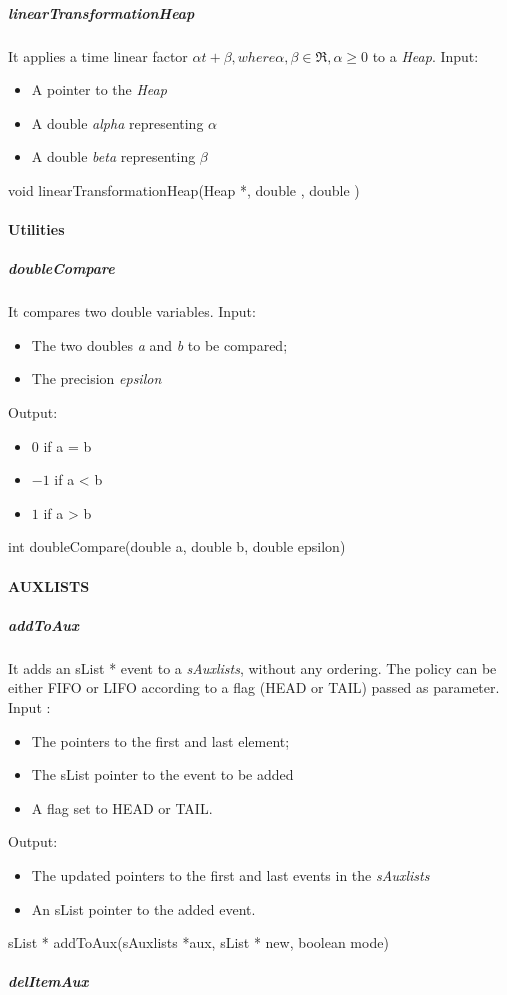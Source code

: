 \subparagraph{linearTransformationHeap}

It applies a time linear factor \(\alpha t + \beta , where \alpha, \beta \in \Re, \alpha \geq 0\) to a \textit{Heap}. 
Input:
\begin{itemize}
\item A pointer to the \textit{Heap} 
\item A double \textit{alpha} representing \(\alpha\)
\item A double \textit{beta} representing \(\beta\)
\end{itemize}
void linearTransformationHeap(Heap *, double , double )


\paragraph{Utilities}
\subparagraph{doubleCompare}

It compares two double variables.
Input:
\begin{itemize}
\item The two doubles \textit{a} and \textit{b} to be compared;
\item The precision \textit{epsilon}
\end{itemize}
Output:
\begin{itemize}
\item $0$  if a = b
\item $-1$ if a < b
\item $1$  if a > b
\end{itemize}
int doubleCompare(double a, double b, double epsilon)

\paragraph{AUXLISTS}

\subparagraph{addToAux}

It adds an sList * event to a \textit{sAuxlists}, without any ordering. The policy can be either FIFO or LIFO according to a flag (HEAD or TAIL) passed as parameter.
Input :
\begin{itemize}
\item The pointers to the first and last element;
\item The sList pointer to the event to be added
\item A flag set to HEAD or TAIL.
\end{itemize}
Output:
\begin{itemize}
\item The updated pointers to the first and last events in the \textit{sAuxlists}
\item An sList pointer to the added event.
\end{itemize}
sList * addToAux(sAuxlists *aux, sList * new, boolean mode)
\subparagraph{delItemAux}

